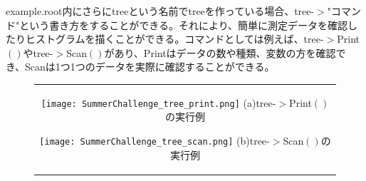 example.root内にさらにtreeという名前でtreeを作っている場合、tree-$>$"コマンド"という書き方をすることができる。それにより、簡単に測定データを確認したりヒストグラムを描くことができる。コマンドとしては例えば、tree-$>$Print$\left(\right)$やtree-$>$Scan$\left(\right)$があり、Printはデータの数や種類、変数の方を確認でき、Scanは1つ1つのデータを実際に確認することができる。
\begin{figure}[htbp]
  \begin{center}
    \begin{tabular}{c}

      \begin{minipage}{0.5\hsize}
        \begin{center}
          \texttt{[image: SummerChallenge\_tree\_print.png]}
          \hspace{1.6cm} (a)tree-$>$Print$\left(\right)$の実行例
        \end{center}
      \end{minipage}

      \begin{minipage}{0.5\hsize}
        \begin{center}
          \texttt{[image: SummerChallenge\_tree\_scan.png]}
          \hspace{1.6cm} (b)tree-$>$Scan$\left(\right)$の実行例
        \end{center}
      \end{minipage}
    \end{tabular}
  \end{center}
\end{figure}

